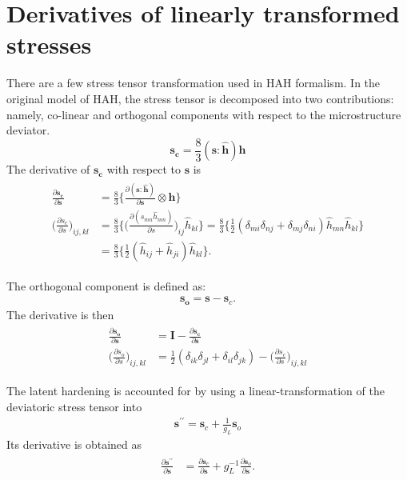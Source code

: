 \documentclass[12pt]{amsart}
\begin{document}
\section{Derivatives of linearly transformed stresses}
\label{sec:stress_deriv}


There are a few stress tensor transformation used in HAH formalism.
In the original model of HAH, the stress tensor is decomposed into two contributions: namely, co-linear and orthogonal components with respect to the microstructure deviator.
\begin{equation}
  \label{eq:decomp1}
  \mathbf{s_c} = \frac{8}{3} (\mathbf{s}:\hat{\mathbf{h}}) \mathbf{h}
\end{equation}
The derivative of $\mathbf{s_c}$ with respect to $\mathbf{s}$ is
\begin{eqnarray}
  \begin{split}
  \label{eq:decomp2}
  \frac{\partial\mathbf{s_c}}{\partial\mathbf{s}}&= \frac{8}{3}\bigg\{  \frac{\partial(\mathbf{s}:\hat{\mathbf{h}})}{\partial\mathbf{s}} \otimes \hat{\mathbf{h}}\bigg\} \\
  \bigg( \frac{\partial s_c}{\partial s}\bigg)_{ij,kl} &= \frac{8}{3}\Bigg\{ \bigg(\frac{\partial(s_{mn}\hat{h}_{mn})}{\partial s}\bigg)_{ij}\hat{h}_{kl} \Bigg\}=\frac{8}{3}\Bigg\{\frac{1}{2}(\delta_{mi}\delta_{nj}+\delta_{mj}\delta_{ni})\hat{h}_{mn}\hat{h}_{kl} \Bigg\}\\
  &=\frac{8}{3}\Bigg\{\frac{1}{2}(\hat{h}_{ij}+\hat{h}_{ji})\hat{h}_{kl} \Bigg\}.
  \end{split}
\end{eqnarray}

The orthogonal component is defined as:
\begin{eqnarray}
  \label{eq:decomp3}
  \mathbf{s_o} = \mathbf{s} - \mathbf{s}_c.
\end{eqnarray}
The derivative is then
\begin{eqnarray}
  \label{eq:decomp4}
  \begin{split}
    \frac{\partial\mathbf{s_o}}{\partial\mathbf{s}} &= \mathbf{I} -   \frac{\partial\mathbf{s_c}}{\partial\mathbf{s}}\\
    \bigg(\frac{\partial s_o}{\partial s}\bigg)_{ij,kl} &= \frac{1}{2}(\delta_{ik}\delta_{jl}+\delta_{il}\delta_{jk})- \bigg(\frac{\partial s_c}{\partial s}\bigg)_{ij,kl}
  \end{split}
\end{eqnarray}


The latent hardening is accounted for by using a linear-transformation of the deviatoric stress tensor into
\begin{eqnarray}
  \label{eq:latent_decompose1}
  \mathbf{s}^{\prime\prime}=\mathbf{s}_c+\frac{1}{g_L}\mathbf{s}_o
\end{eqnarray}
Its derivative is obtained as
\begin{eqnarray}
  \begin{split}
    \label{eq:latent_decompose2}
    \frac{\partial\mathbf{s}^{\prime\prime}}{\partial\mathbf{s}} &=\frac{\partial\mathbf{s}_c}{\partial\mathbf{s}} + g_L^{-1} \frac{\partial\mathbf{s}_o}{\partial\mathbf{s}}.
  \end{split}
\end{eqnarray}
\end{document}
